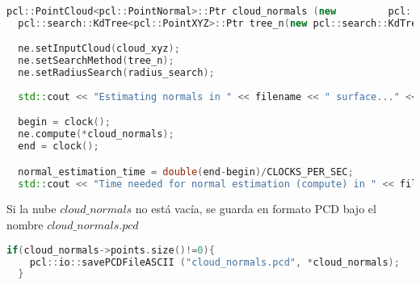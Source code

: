 \begin{lstlisting}[language=C++,breaklines]
  pcl::PointCloud<pcl::PointNormal>::Ptr cloud_normals (new 		pcl::PointCloud<pcl::PointNormal>);
  pcl::search::KdTree<pcl::PointXYZ>::Ptr tree_n(new pcl::search::KdTree<pcl::PointXYZ>());

  ne.setInputCloud(cloud_xyz);
  ne.setSearchMethod(tree_n);
  ne.setRadiusSearch(radius_search);
 
  std::cout << "Estimating normals in " << filename << " surface..." <<std::endl;

  begin = clock();
  ne.compute(*cloud_normals);
  end = clock();

  normal_estimation_time = double(end-begin)/CLOCKS_PER_SEC;
  std::cout << "Time needed for normal estimation (compute) in " << filename << ": " << normal_estimation_time << " seconds" << std::endl << std::endl;
\end{lstlisting}
  
\iffalse
Debido a que el método $compute$ solamente guarda en $cloud\_normals$ los vectores normales extraídos de la nube $cloud\_xyz$, la primera carece de información de coordenadas XYZ sobre los puntos originales. Por lo tanto, se copia dicha información de $cloud\_xyz$ a $cloud\_normals$.

\begin{lstlisting}[language=C++,breaklines]
  std::cout << "Copying xyz information from" << filename << " to cloud with normals information..." << std::endl;

  begin = clock();

  for(size_t i = 0; i<cloud_normals->points.size(); ++i)
  {
  	cloud_normals->points[i].x = cloud_xyz->points[i].x;
  	cloud_normals->points[i].y = cloud_xyz->points[i].y;
  	cloud_normals->points[i].z = cloud_xyz->points[i].z;
  }

  end = clock();
  elapsed_sec = double(end-begin)/CLOCKS_PER_SEC;
  std::cout << "Time needed for copying the pointcloud: " << elapsed_sec <<" seconds" << std::endl << std::endl;
\end{lstlisting}
\fi

  Si la nube $cloud\_normals$ no está vacía, se guarda en formato PCD bajo el nombre $cloud\_normals.pcd$
  
\begin{lstlisting}[language=C++,breaklines]
  if(cloud_normals->points.size()!=0){
  	pcl::io::savePCDFileASCII ("cloud_normals.pcd", *cloud_normals);
  }
\end{lstlisting}

